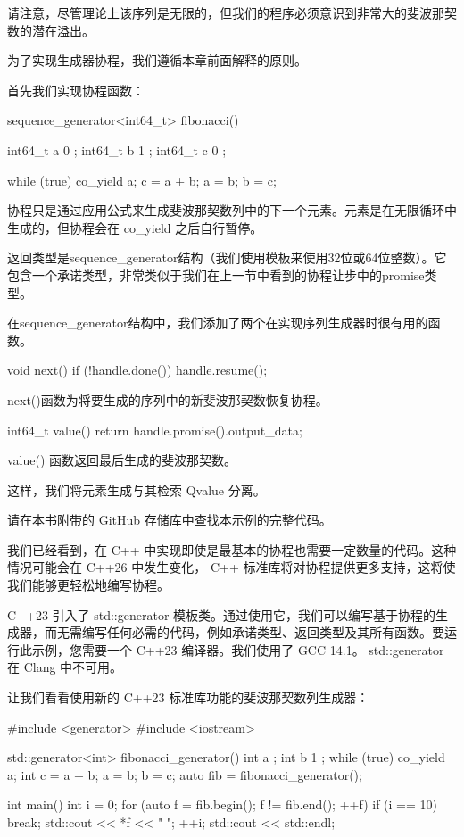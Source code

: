 请注意，尽管理论上该序列是无限的，但我们的程序必须意识到非常大的斐波那契数的潜在溢出。

为了实现生成器协程，我们遵循本章前面解释的原则。

首先我们实现协程函数：

\begin{cpp}
sequence_generator<int64_t> fibonacci() {
    int64_t a{ 0 };
    int64_t b{ 1 };
    int64_t c{ 0 };

    while (true) {
        co_yield a;
        c = a + b;
        a = b;
        b = c;
    }
}
\end{cpp}

协程只是通过应用公式来生成斐波那契数列中的下一个元素。元素是在无限循环中生成的，但协程会在 co\_yield 之后自行暂停。

返回类型是sequence\_generator结构（我们使用模板来使用32位或64位整数）。它包含一个承诺类型，非常类似于我们在上一节中看到的协程让步中的promise类型。

在sequence\_generator结构中，我们添加了两个在实现序列生成器时很有用的函数。

\begin{cpp}
void next() {
    if (!handle.done()) {
        handle.resume();
    }
}
\end{cpp}

next()函数为将要生成的序列中的新斐波那契数恢复协程。

\begin{cpp}
int64_t value() {
    return handle.promise().output_data;
}
\end{cpp}

value() 函数返回最后生成的斐波那契数。

这样，我们将元素生成与其检索 Qvalue 分离。

请在本书附带的 GitHub 存储库中查找本示例的完整代码。


我们已经看到，在 C++ 中实现即使是最基本的协程也需要一定数量的代码。这种情况可能会在 C++26 中发生变化， C++ 标准库将对协程提供更多支持，这将使我们能够更轻松地编写协程。

C++23 引入了 std::generator 模板类。通过使用它，我们可以编写基于协程的生成器，而无需编写任何必需的代码，例如承诺类型、返回类型及其所有函数。要运行此示例，您需要一个 C++23 编译器。我们使用了 GCC 14.1。 std::generator 在 Clang 中不可用。

让我们看看使用新的 C++23 标准库功能的斐波那契数列生成器：

\begin{cpp}
#include <generator>
#include <iostream>

std::generator<int> fibonacci_generator() {
    int a{ };
    int b{ 1 };
    while (true) {
        co_yield a;
        int c = a + b;
        a = b;
        b = c;
    }
}
auto fib = fibonacci_generator();

int main() {
    int i = 0;
    for (auto f = fib.begin(); f != fib.end(); ++f) {
        if (i == 10) {
            break;
        }
        std::cout << *f << " ";
        ++i;
    }
    std::cout << std::endl;
}
\end{cpp}


